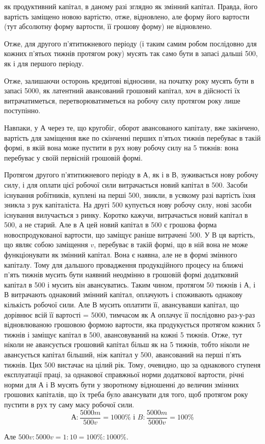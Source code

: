 \parcont{}  %
як продуктивний капітал, в даному разі зглядно як змінний капітал.
Правда, його вартість заміщено новою вартістю, отже, відновлено, але
форму його вартости (тут абсолютну форму вартости, її грошову форму)
не відновлено.

Отже, для другого п’ятитижневого періоду (і таким самим робом
послідовно для кожних п’ятьох тижнів протягом року) мусять так
само бути в запасі дальші 500, як і для першого періоду.

Отже, залишаючи осторонь кредитові відносини, на початку року мусять
бути в запасі 5000, як латентний авансований грошовий капітал,
хоч в дійсності їх витрачатиметься, перетворюватиметься на робочу
силу протягом року лише поступінно.

Навпаки, у $А$ через те, що кругобіг, оборот авансованого капіталу,
вже закінчено, вартість для заміщення вже по скінченні перших п’ятьох
тижнів перебуває в такій формі, в якій вона може пустити в рух нову
робочу силу на 5 тижнів: вона перебуває у своїй первісній грошовій формі.

Протягом другого п’ятитижневого періоду в $А$, як і в $В$, зуживається
нову робочу силу, і для оплати цієї робочої сили витрачається новий капітал
в 500. Засоби існування робітників, куплені на перші 500, зникли, в усякому разі вартість їхня зникла з рук капіталіста.
На другі 500 купується нову робочу силу, нові засоби існування
вилучається з ринку. Коротко кажучи, витрачається новий капітал в 500, а не старий. Але в $А$ цей новий капітал в 500 є грошова
форма новоспродукованої вартости, що заміщує раніше витрачені 500. У $В$ ця вартість, що являє собою заміщення $v$, перебуває в такій
формі, що в ній вона не може функціонувати як змінний капітал. Вона є
наявна, але не в формі змінного капіталу. Тому для дальшого провадження
продукційного процесу на ближчі п’ять тижнів мусить бути наявний неодмінно
в грошовій формі додатковий капітал в 500 і мусить він авансуватись.
Таким чином, протягом 50 тижнів і $А$, і $В$ витрачають однаковий
змінний капітал, оплачують і споживають однакову кількість робочої сили.
Але $В$ мусить оплатити її, авансувавши капітал, що дорівнює всій її
вартості = 5000, тимчасом як $А$ оплачує її послідовно раз-у-раз
відновлюваною грошовою формою вартости, яка продукується протягом
кожних 5 тижнів і заміщує капітал в 500, авансовуваний на кожні
5 тижнів. Отже, тут ніколи не авансується грошовий капітал більш як
на 5 тижнів, тобто ніколи не авансується капітал більший, ніж капітал
у 500, авансований на перші п’ять тижнів. Цих 500 вистачає
на цілий рік. Тому, очевидно, що за однакового ступеня експлуатації
праці, за однакової справжньої норми додаткової вартости, річні
норми для $А$ і В мусять бути у зворотному відношенні до величин змінних
грошових капіталів, що їх треба було авансувати для того, щоб
протягом року пустити в рух ту саму масу робочої сили.
\[
А: \frac{5000 m}{500 v} = 1000\% \text{ і } B: \frac{5000 m}{5000 v} = 100\%
\]

Але $500 v: 5000 v = 1: 10 = 100\%: 1000\%$.

